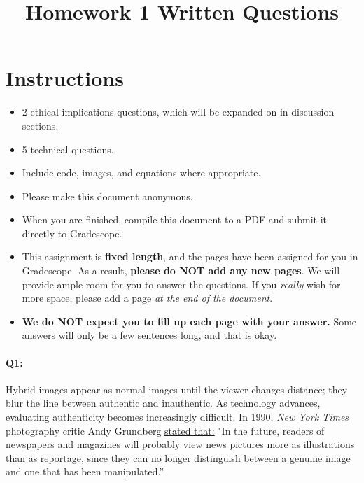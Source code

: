 \date{}

\title{\vspace{-1cm}Homework 1 Written Questions}



\maketitle
\vspace{-3cm}
\thispagestyle{fancy}

\section*{Instructions}
\begin{itemize}
  \item 2 ethical implications questions, which will be expanded on in discussion sections.
  \item 5 technical questions.
  \item Include code, images, and equations where appropriate.
  \item Please make this document anonymous.
  \item When you are finished, compile this document to a PDF and submit it directly to Gradescope. 
  \item This assignment is \textbf{fixed length}, and the pages have been assigned for you in Gradescope. As a result, \textbf{please do NOT add any new pages}. We will provide ample room for you to answer the questions. If you \emph{really} wish for more space, please add a page \emph{at the end of the document}.
  \item \textbf{We do NOT expect you to fill up each page with your answer.} Some answers will only be a few sentences long, and that is okay.
\end{itemize}
\pagebreak

\paragraph{Q1:} Hybrid images appear as normal images until the viewer changes distance; they blur the line between authentic and inauthentic. As technology advances, evaluating authenticity becomes increasingly difficult. In 1990, \emph{New York Times} photography critic Andy Grundberg \href{https://www.nytimes.com/1990/08/12/arts/photography-view-ask-it-no-questions-the-camera-can-lie.html}{stated that:} "In the future, readers of newspapers and magazines will probably view news pictures more as illustrations than as reportage, since they can no longer distinguish between a genuine image and one that has been manipulated.''

